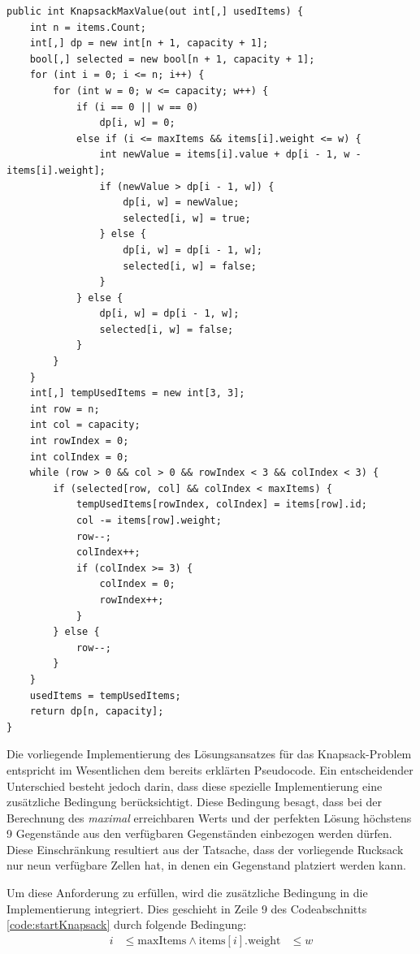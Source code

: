 \begin{itemize}
\begin{lstlisting}[style=csharp, caption={Knapsack Algorithmus / Item Backtracking}, label=code:startKnapsack]
public int KnapsackMaxValue(out int[,] usedItems) {
    int n = items.Count;
    int[,] dp = new int[n + 1, capacity + 1];
    bool[,] selected = new bool[n + 1, capacity + 1];
    for (int i = 0; i <= n; i++) {
        for (int w = 0; w <= capacity; w++) {
            if (i == 0 || w == 0)
                dp[i, w] = 0;
            else if (i <= maxItems && items[i].weight <= w) {
                int newValue = items[i].value + dp[i - 1, w - items[i].weight];
                if (newValue > dp[i - 1, w]) {
                    dp[i, w] = newValue;
                    selected[i, w] = true;
                } else {
                    dp[i, w] = dp[i - 1, w];
                    selected[i, w] = false;
                }
            } else {
                dp[i, w] = dp[i - 1, w];
                selected[i, w] = false;
            }
        }
    }
    int[,] tempUsedItems = new int[3, 3];
    int row = n;
    int col = capacity;
    int rowIndex = 0;
    int colIndex = 0;
    while (row > 0 && col > 0 && rowIndex < 3 && colIndex < 3) {
        if (selected[row, col] && colIndex < maxItems) {
            tempUsedItems[rowIndex, colIndex] = items[row].id;
            col -= items[row].weight;
            row--;
            colIndex++;
            if (colIndex >= 3) {
                colIndex = 0;
                rowIndex++;
            }
        } else {
            row--;
        }
    }
    usedItems = tempUsedItems;
    return dp[n, capacity];
}
\end{lstlisting}
Die vorliegende Implementierung des Lösungsansatzes für das Knapsack-Problem entspricht im Wesentlichen dem bereits
erklärten Pseudocode. Ein entscheidender Unterschied besteht jedoch darin, dass diese spezielle Implementierung eine
zusätzliche Bedingung berücksichtigt. Diese Bedingung besagt, dass bei der Berechnung des \textit{maximal} erreichbaren
Werts und der perfekten Lösung höchstens 9 Gegenstände aus den verfügbaren Gegenständen einbezogen werden dürfen. Diese
Einschränkung resultiert aus der Tatsache, dass der vorliegende Rucksack nur neun verfügbare Zellen hat, in denen ein
Gegenstand platziert werden kann.

Um diese Anforderung zu erfüllen, wird die zusätzliche Bedingung in die Implementierung integriert. Dies geschieht in
Zeile 9 des Codeabschnitts \ref{code:startKnapsack} durch folgende Bedingung:
\\
\begin{equation}
\begin{aligned}
i &\leq \text{maxItems} \land
\text{items}[i].\text{weight} &\leq w
\end{aligned}
\end{equation}


\end{itemize}
